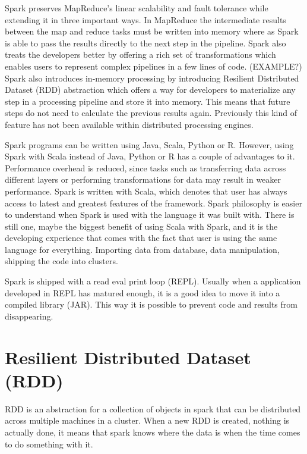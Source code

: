 \documentclass[12pt,a4paper,english
]{tutthesis}
\begin{document}
Spark preserves MapReduce's linear scalability and fault tolerance while extending it in three important ways. In MapReduce the intermediate results between the map and reduce tasks must be written into memory where as Spark is able to pass the results directly to the next step in the pipeline. Spark also treats the developers better by offering a rich set of transformations which enables users to represent complex pipelines in a few lines of code. (EXAMPLE?) Spark also introduces in-memory processing by introducing Resilient Distributed Dataset (RDD) abstraction which offers a way for developers to materialize any step in a processing pipeline and store it into memory. This means that future steps do not need to calculate the previous results again. Previously this kind of feature has not been available within distributed processing engines. \cite{ryza15}

Spark programs can be written using Java, Scala, Python or R. However, using Spark with Scala instead of Java, Python or R has a couple of advantages to it. Performance overhead is reduced, since tasks such as transferring data across different layers or performing transformations for data may result in weaker performance. Spark is written with Scala, which denotes that user has always access to latest and greatest features of the framework. Spark philosophy is easier to understand when Spark is used with the language it was built with. There is still one, maybe the biggest benefit of using Scala with Spark, and it is the developing experience that comes with the fact that user is using the same language for everything. Importing data from database, data manipulation, shipping the code into clusters. \cite{ryza15}

Spark is shipped with a read eval print loop (REPL). Usually when a application developed in REPL has matured enough, it is a good idea to move it into a compiled library (JAR). This way it is possible to prevent code and results from disappearing.

\section{Resilient Distributed Dataset (RDD)}

RDD is an abstraction for a collection of objects in spark that can be distributed across multiple machines in a cluster. When a new RDD is created, nothing is actually done, it means that spark knows where the data is when the time comes to do something with it.
\end{document}
